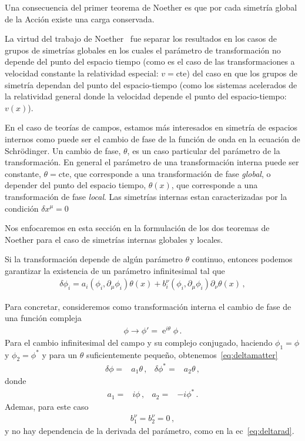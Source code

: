 Una consecuencia del primer teorema de Noether es que por cada simetría global de la Acción existe una carga conservada. 




La virtud del trabajo de Noether~\cite{Noether,Brading:2000hc,Brading:2003nv,Sundermeyer:2014kha} fue separar los resultados  en los casos de grupos de simetrías globales en los cuales el parámetro de transformación no depende del punto del espacio tiempo (como es el caso de las transformaciones a velocidad constante la relatividad especial: $v=\text{cte}$) del caso en que los grupos de simetría dependan del punto del espacio-tiempo (como los sistemas acelerados de la relatividad general donde la velocidad depende el punto del espacio-tiempo: $v(x)$).

En el caso de teorías de campos, estamos más interesados en simetría de espacios internos como puede ser el cambio de fase de la función de onda en la ecuación de Schrödinger. Un cambio de fase, $\theta$, es un caso particular del parámetro de la transformación. En general el parámetro de una transformación interna puede ser constante, $\theta=\text{cte}$, que corresponde a una transformación de fase  \emph{global}, o depender del punto del espacio tiempo, $\theta(x)$, que corresponde  a una transformación  de fase \emph{local}. Las simetrías internas estan caracterizadas por la condición $\delta x^\mu=0$ 

Nos enfocaremos en esta sección en la formulación de los dos teoremas de Noether para el caso de simetrías internas globales y locales.   


Si la transformación depende de algún parámetro $\theta$ continuo, entonces podemos garantizar la existencia de un parámetro infinitesimal tal que
\begin{align}
\label{eq:infdt}
 \delta\phi_i= a_{i}\left( \phi_{i},\partial_{\mu}\phi_{i} \right) \theta(x)+b^{\nu}_i \left( \phi_{i},\partial_{\mu}\phi_{i} \right) \partial_{\nu}\theta(x)\,,
\end{align}

Para concretar, consideremos como transformación interna el cambio de fase de una función compleja
\begin{align}
  \phi\to \phi'=\operatorname{e}^{i\theta}\phi\,.
\end{align}
Para el cambio infinitesimal del campo y su complejo conjugado,  haciendo $\phi_1=\phi$ y $\phi_2=\phi^{*}$ y
para un $\theta$ suficientemente pequeño, obtenemos~\eqref{eq:deltamatter}
\begin{align}
  \delta\phi=&a_1 \theta\,, &  \delta\phi^{*}=&  a_2 \theta\,, 
\end{align}
donde
\begin{align}
  a_1=& i\phi \,, & a_2=&-i\phi^{*}\,.
\end{align}
Ademas, para este caso
\begin{align}
  b_1^\nu=b_2^\nu=0\,,
\end{align}
y no hay dependencia de la derivada del parámetro, como en la ec~\eqref{eq:deltarad}.

